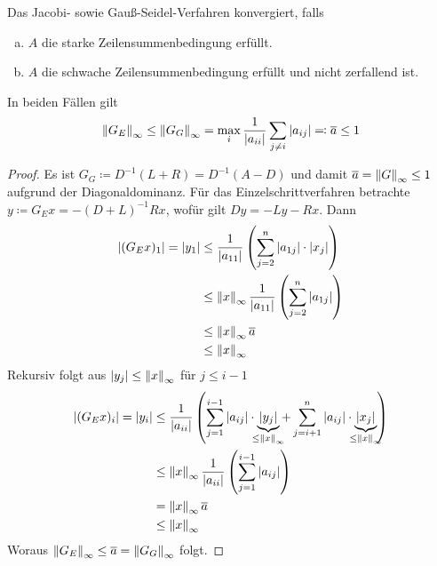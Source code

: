 \begin{Satze}[Zeilensummenkriterium]
  \label{9.3.9}
  Das Jacobi- sowie Gauß-Seidel-Verfahren konvergiert, falls 
  \begin{enumerate}[a)]
  \item $A$ die starke Zeilensummenbedingung erfüllt.
  \item $A$ die schwache Zeilensummenbedingung erfüllt und nicht
    zerfallend ist.
  \end{enumerate}
In beiden Fällen gilt
\begin{gather}
  \left\| G_E \right\|_\infty \leq \left\| G_G \right\|_\infty 
  = \max_i\frac{1}{|a_{ii}|}\sum_{j\neq i} |a_{ij}|
  \eqqcolon \overline{a} \leq 1
  \label{IX.3.9}
\end{gather}
\begin{proof}
  Es ist $G_G\coloneqq D^{-1}(L+R) = D^{-1}(A-D)$ und damit 
  $\overline{a}=\left\| G \right\|_\infty\leq 1$ aufgrund der Diagonaldominanz.
  Für das Einzelschrittverfahren betrachte 
    $y\coloneqq G_E x=-(D+L)^{-1}Rx$, wofür gilt
$Dy = -Ly-Rx$. Dann
\begin{align*}
  |(G_Ex)_1| = |y_1| &\leq \frac{1}{|a_{11}|}\left(
                       \sum_{j=2}^{n}|a_{1j}|\cdot |x_j|
                       \right) \\
                     &\leq \left\| x \right\|_\infty \frac{1}{|a_{11}|}\left(
                       \sum_{j=2}^{n}|a_{1j}|
                       \right) \\
                     &\leq \left\| x \right\|_\infty \overline{a}\\
                     &\leq \left\| x \right\|_\infty
\end{align*}
Rekursiv folgt aus $|y_j|\leq \left\| x \right\|_\infty $ für $j\leq i-1$
\begin{align}\nonumber
  |(G_Ex)_i| = |y_i| &\leq \frac{1}{|a_{ii}|}\left(
                       \sum_{j=1}^{i-1}|a_{ij}|
                       \cdot \underbrace{|y_j|}_{\mathclap{\leq\nn{x}_\infty}}
                       +\sum_{j=i+1}^{n}|a_{ij}|
                       \cdot \underbrace{|x_j|}_{\mathclap{\leq\nn{x}_\infty}}
                       \right)\\\nonumber
                     &\leq \nn{x}_\infty \frac{1}{|a_{ii}|}\left(
                       \sum_{j=1}^{i-1}|a_{ij}|
                       \right) \\\nonumber
                     &=\nn{x}_\infty \overline{a}\\
  &\leq \nn{x}_\infty
    \label{IX.3.10}
\end{align}
Woraus $\left\| G_E \right\|_\infty \leq \overline{a}=\left\| G_G \right\|_\infty$ folgt.


\end{proof}
\end{Satze}
